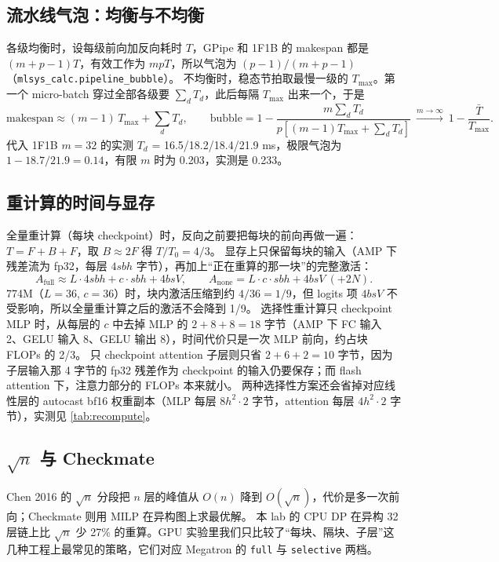 \documentclass[11pt,a4paper]{ctexart}
\begin{document}
\subsection{流水线气泡：均衡与不均衡}
各级均衡时，设每级前向加反向耗时 $T$，GPipe 和 1F1B 的 makespan 都是 $(m+p-1)T$，有效工作为 $mpT$，所以气泡为 $(p-1)/(m+p-1)$（\texttt{mlsys\_calc.pipeline\_bubble}）。
不均衡时，稳态节拍取最慢一级的 $T_{\max}$。第一个 micro-batch 穿过全部各级要 $\sum_d T_d$，此后每隔 $T_{\max}$ 出来一个，于是
\begin{equation}
\text{makespan} \approx (m-1)\,T_{\max} + \sum_{d} T_d,\qquad
\text{bubble} = 1 - \frac{m\sum_d T_d}{p\left[(m-1)T_{\max}+\sum_d T_d\right]}\ \xrightarrow{m\to\infty}\ 1-\frac{\bar T}{T_{\max}}.
\end{equation}
代入 1F1B $m=32$ 的实测 $T_d$ = 16.5/18.2/18.4/21.9 ms，极限气泡为 $1-18.7/21.9=0.14$，有限 $m$ 时为 0.203，实测是 0.233。

\subsection{重计算的时间与显存}
全量重计算（每块 checkpoint）时，反向之前要把每块的前向再做一遍：$T = F + B + F$，取 $B\approx2F$ 得 $T/T_0 = 4/3$。
显存上只保留每块的输入（AMP 下残差流为 fp32，每层 $4sbh$ 字节），再加上“正在重算的那一块”的完整激活：
\begin{equation}
A_{\text{full}} \approx L\cdot 4sbh + c\cdot sbh + 4bsV,\qquad A_{\text{none}} = L\cdot c\cdot sbh + 4bsV \ (+2N).
\end{equation}
774M（$L=36$, $c=36$）时，块内激活压缩到约 $4/36=1/9$，但 logits 项 $4bsV$ 不受影响，所以全量重计算之后的激活不会降到 1/9。
选择性重计算只 checkpoint MLP 时，从每层的 $c$ 中去掉 MLP 的 $2+8+8=18$ 字节（AMP 下 FC 输入 2、GELU 输入 8、GELU 输出 8），时间代价只是一次 MLP 前向，约占块 FLOPs 的 2/3。
只 checkpoint attention 子层则只省 $2+6+2=10$ 字节，因为子层输入那 4 字节的 fp32 残差作为 checkpoint 的输入仍要保存；而 flash attention 下，注意力部分的 FLOPs 本来就小。
两种选择性方案还会省掉对应线性层的 autocast bf16 权重副本（MLP 每层 $8h^2\cdot2$ 字节，attention 每层 $4h^2\cdot2$ 字节），实测见 \cref{tab:recompute}。

\subsection{$\sqrt n$ 与 Checkmate}
Chen 2016 的 $\sqrt n$ 分段把 $n$ 层的峰值从 $O(n)$ 降到 $O(\sqrt n)$，代价是多一次前向；Checkmate 则用 MILP 在异构图上求最优解。
本 lab 的 CPU DP 在异构 32 层链上比 $\sqrt n$ 少 27\% 的重算。GPU 实验里我们只比较了“每块、隔块、子层”这几种工程上最常见的策略，它们对应 Megatron 的 \texttt{full} 与 \texttt{selective} 两档。
\end{document}
